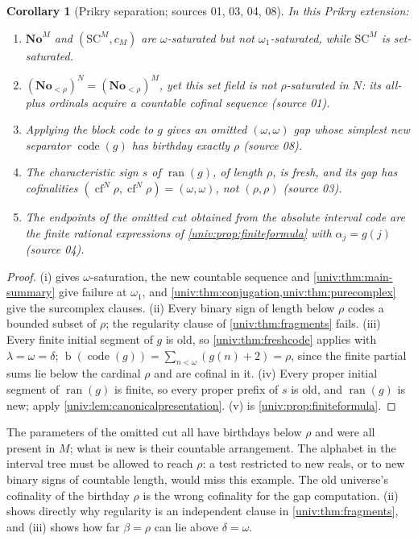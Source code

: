 \documentclass[11pt,letterpaper]{article}
\numberwithin{equation}{section}
\newtheorem{corollary}[corollary]{Corollary}
\theoremstyle{definition}
\theoremstyle{remark}
\newcommand{\No}{\mathbf{No}}
\newcommand{\SC}{\mathrm{SC}}
\newcommand{\NoM}{\No^{M}}
\newcommand{\SCM}{\SC^{M}}
\newcommand{\bd}{\operatorname{b}}
\newcommand{\cf}{\operatorname{cf}}
\newcommand{\ran}{\operatorname{ran}}
\newcommand{\code}{\operatorname{code}}
\begin{document}
\begin{corollary}[Prikry separation; sources 01, 03, 04, 08]\label{univ:cor:prikry}
In this Prikry extension:
\begin{enumerate}[label=\textnormal{(\roman*)}]
\item $\NoM$ and $(\SCM,c_M)$ are $\omega$-saturated but not
$\omega_1$-saturated, while $\SCM$ is set-saturated.
\item $(\No_{<\rho})^N=(\No_{<\rho})^M$, yet this set field is not
$\rho$-saturated in $N$: its all-plus ordinals acquire a countable cofinal
sequence \textup{(source 01)}.
\item Applying the block code to $g$ gives an omitted $(\omega,\omega)$ gap
whose simplest new separator $\code(g)$ has birthday exactly $\rho$
\textup{(source 08)}.
\item The characteristic sign $s$ of $\ran(g)$, of length $\rho$, is fresh, and
its gap has cofinalities $(\cf^N\rho,\cf^N\rho)=(\omega,\omega)$, not
$(\rho,\rho)$ \textup{(source 03)}.
\item The endpoints of the omitted cut obtained from the absolute interval
code are the finite rational expressions of \cref{univ:prop:finiteformula}
with $\alpha_j=g(j)$ \textup{(source 04)}.
\end{enumerate}
\end{corollary}
\begin{proof}
(i)  gives $\omega$-saturation, the new countable sequence
and \cref{univ:thm:main-summary} give failure at $\omega_1$, and
\cref{univ:thm:conjugation,univ:thm:purecomplex} give the surcomplex clauses.
(ii) Every binary sign of length below $\rho$ codes a bounded subset of $\rho$;
the regularity clause of \cref{univ:thm:fragments} fails. (iii) Every finite
initial segment of $g$ is old, so \cref{univ:thm:freshcode} applies with
$\lambda=\omega=\delta$; $\bd(\code(g))=\sum_{n<\omega}(g(n)+2)=\rho$, since the
finite partial sums lie below the cardinal $\rho$ and are cofinal in it. (iv)
Every proper initial segment of $\ran(g)$ is finite, so every proper prefix of
$s$ is old, and $\ran(g)$ is new; apply \cref{univ:lem:canonicalpresentation}.
(v) is \cref{univ:prop:finiteformula}.
\end{proof}

The parameters of the omitted cut all have birthdays below $\rho$ and were all
present in $M$; what is new is their countable arrangement. The alphabet in the
interval tree must be allowed to reach $\rho$: a test restricted to new reals,
or to new binary signs of countable length, would miss this example. The old
universe's cofinality of the birthday $\rho$ is the wrong cofinality for the
gap computation. (ii) shows directly why regularity is an
independent clause in \cref{univ:thm:fragments}, and (iii) shows how far
$\beta=\rho$ can lie above $\delta=\omega$.
\end{document}
